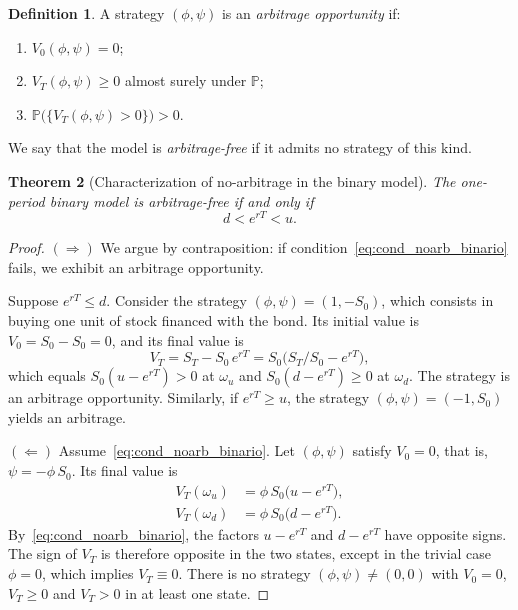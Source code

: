 \documentclass[11pt,a4paper,oneside]{report}
\theoremstyle{plain}
\newtheorem{teorema}{Theorem}[chapter]
\theoremstyle{definition}
\newtheorem{definicion}[teorema]{Definition}
\theoremstyle{remark}
\newcommand{\PP}{\mathbb{P}}
\newcommand{\1}{\mathbf{1}}
\begin{document}
\begin{definicion}
\label{def:arbitraje}
A strategy $(\phi, \psi)$ is an \emph{arbitrage opportunity} if:
\begin{enumerate}[label=\textnormal{(\roman*)}]
  \item $V_0(\phi, \psi) = 0$;
  \item $V_T(\phi, \psi) \geq 0$ almost surely under $\PP$;
  \item $\PP\bigl(\{V_T(\phi, \psi) > 0\}\bigr) > 0$.
\end{enumerate}
We say that the model is \emph{arbitrage-free} if it admits no
strategy of this kind.
\end{definicion}

\medskip

\begin{teorema}[Characterization of no-arbitrage in the binary model]
\label{teo:noarb_binario}
The one-period binary model is arbitrage-free if and only if
\begin{equation}\label{eq:cond_noarb_binario}
  d < e^{rT} < u.
\end{equation}
\end{teorema}

\begin{proof}
$(\Rightarrow)$ We argue by contraposition: if
condition~\eqref{eq:cond_noarb_binario} fails, we exhibit an
arbitrage opportunity.

Suppose $e^{rT} \leq d$. Consider the strategy
$(\phi, \psi) = (1, -S_0)$, which consists in buying one unit of stock
financed with the bond. Its initial value is $V_0 = S_0 - S_0 = 0$,
and its final value is
\begin{equation*}
  V_T = S_T - S_0\, e^{rT} = S_0\bigl(S_T/S_0 - e^{rT}\bigr),
\end{equation*}
which equals $S_0(u - e^{rT}) > 0$ at $\omega_u$ and
$S_0(d - e^{rT}) \geq 0$ at $\omega_d$. The strategy is an arbitrage
opportunity. Similarly, if $e^{rT} \geq u$, the strategy
$(\phi, \psi) = (-1, S_0)$ yields an arbitrage.

$(\Leftarrow)$ Assume~\eqref{eq:cond_noarb_binario}. Let
$(\phi, \psi)$ satisfy $V_0 = 0$, that is, $\psi = -\phi\, S_0$. Its
final value is
\begin{align*}
  V_T(\omega_u) &= \phi\, S_0\bigl(u - e^{rT}\bigr), \\
  V_T(\omega_d) &= \phi\, S_0\bigl(d - e^{rT}\bigr).
\end{align*}
By~\eqref{eq:cond_noarb_binario}, the factors $u - e^{rT}$ and
$d - e^{rT}$ have opposite signs. The sign of $V_T$ is therefore
opposite in the two states, except in the trivial case $\phi = 0$,
which implies $V_T \equiv 0$. There is no strategy
$(\phi, \psi) \neq (0, 0)$ with $V_0 = 0$, $V_T \geq 0$ and $V_T > 0$
in at least one state.
\end{proof}
\end{document}
